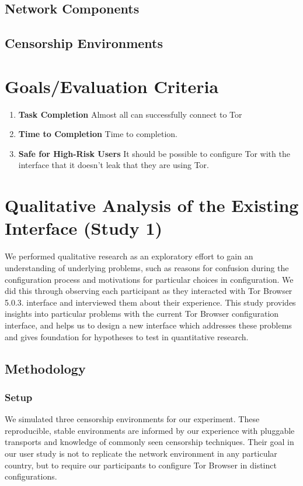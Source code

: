 \documentclass{template}
\begin{document}
\subsection{Network Components} 
\subsection{Censorship Environments} 

\section{Goals/Evaluation Criteria} 
\begin{enumerate} \itemsep1pt \parskip0pt 
    \item {\bfseries Task Completion} Almost all can successfully connect to Tor
    \item {\bfseries Time to Completion} Time to completion. 
    \item {\bfseries Safe for High-Risk Users} It should be possible to configure Tor with the interface that it doesn't leak that they are using Tor. 
\end{enumerate}

\section{Qualitative Analysis of the Existing Interface (Study 1)}
We performed qualitative research as an exploratory effort to gain an 
understanding of underlying problems, such as reasons for confusion 
during the configuration process and motivations for particular choices in 
configuration. We did this through observing each participant as they 
interacted with Tor Browser 5.0.3. interface and interviewed them about
their experience. This study provides insights into particular problems with 
the current Tor Browser configuration interface, and helps us to design
a new interface which addresses these problems and gives foundation
for hypotheses to test in quantitative research. 

\subsection{Methodology} 
\subsubsection{Setup}
\label{sec:setup}
We simulated three censorship environments for our experiment.
These reproducible, stable environments are informed by our experience 
with pluggable transports and knowledge of commonly seen censorship 
techniques. Their goal in our user study is not to replicate the network 
environment in any particular country, but to require our participants to 
configure Tor Browser in distinct configurations. 
\end{document}
